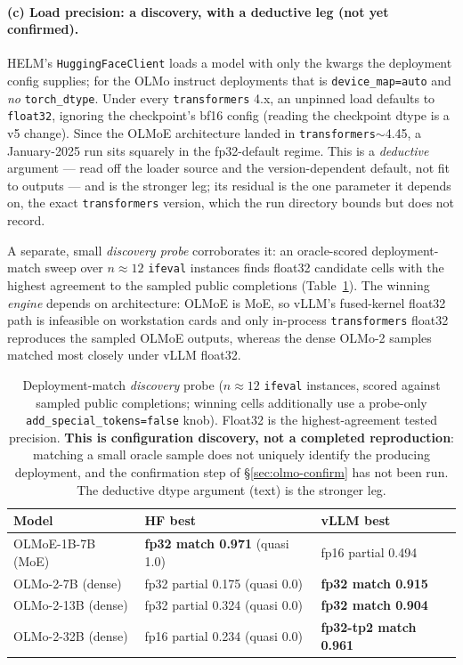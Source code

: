 \paragraph{(c) Load precision: a discovery, with a deductive leg (not yet
confirmed).} HELM's \texttt{HuggingFaceClient} loads a model with only the kwargs
the deployment config supplies; for the OLMo instruct deployments that is
\texttt{device\_map=auto} and \emph{no} \texttt{torch\_dtype}. Under every
\texttt{transformers} 4.x, an unpinned load defaults to \texttt{float32}, ignoring the
checkpoint's bf16 config (reading the checkpoint dtype is a v5 change). Since the
OLMoE architecture landed in \texttt{transformers}${\sim}$4.45, a January-2025 run
sits squarely in the fp32-default regime. This is a \emph{deductive} argument ---
read off the loader source and the version-dependent default, not fit to outputs
--- and is the stronger leg; its residual is the one parameter it depends on, the
exact \texttt{transformers} version, which the run directory bounds but does not
record.

A separate, small \emph{discovery probe} corroborates it: an oracle-scored
deployment-match sweep over $n\approx 12$ \texttt{ifeval} instances finds float32
candidate cells with the highest agreement to the sampled public completions
(Table~\ref{tab:fp32}). The winning \emph{engine} depends on architecture:
OLMoE is MoE, so vLLM's fused-kernel float32 path is infeasible on workstation
cards and only in-process \texttt{transformers} float32 reproduces the sampled
OLMoE outputs, whereas the dense OLMo-2 samples matched most closely under vLLM
float32.

\begin{table}[t]
\caption{Deployment-match \emph{discovery} probe ($n\approx 12$ \texttt{ifeval}
instances, scored against sampled public completions; winning cells additionally
use a probe-only \texttt{add\_special\_tokens=false} knob). Float32 is the
highest-agreement tested precision. \textbf{This is configuration discovery, not a
completed reproduction}: matching a small oracle sample does not uniquely identify
the producing deployment, and the confirmation step of \S\ref{sec:olmo-confirm}
has not been run. The deductive dtype argument (text) is the stronger leg.}
\label{tab:fp32}
\begin{center}
\small
\begin{tabular}{lll}
\toprule
\textbf{Model} & \textbf{HF best} & \textbf{vLLM best} \\
\midrule
OLMoE-1B-7B (MoE)   & \textbf{fp32 match 0.971} (quasi 1.0) & fp16 partial 0.494 \\
OLMo-2-7B (dense)   & fp32 partial 0.175 (quasi 0.0)       & \textbf{fp32 match 0.915} \\
OLMo-2-13B (dense)  & fp32 partial 0.324 (quasi 0.0)       & \textbf{fp32 match 0.904} \\
OLMo-2-32B (dense)  & fp16 partial 0.234 (quasi 0.0)       & \textbf{fp32-tp2 match 0.961} \\
\bottomrule
\end{tabular}
\end{center}
\end{table}


